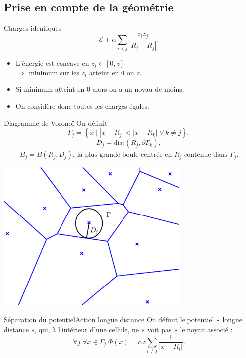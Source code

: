 \documentclass{beamer}
\begin{document}
\subsection{Prise en compte de la géométrie}
\begin{frame}{Charges identiques}
            \[\mathcal{E} + \alpha\sum_{i < j} \frac{z_i z_j}{|R_i-R_j|}.\]
    \begin{itemize}
        \item L'énergie est concave en $z_i \in [0, z]$\\
            $\Rightarrow$ minimum sur les $z_i$ atteint en $0$ ou $z$.
        \item Si minimum atteint en $0$ alors on a un noyau de moins.
        \item On considère donc toutes les charges égales.
    \end{itemize}
\end{frame}
\begin{frame}{Diagramme de Voronoï}
    On définit
              \[\Gamma_j = \left\{x \; \big| \; |x-R_j| < |x-R_k|\; \forall\, k\neq j\right\},\]
              \[D_j = \text{dist}(R_j, \mathit{\partial}\Gamma_k),\]
              \[B_j = \overline{B(R_j, D_j)}\text{, la plus grande boule centrée en $R_j$ contenue
              dans }\Gamma_j.\]
    \begin{center}
    \includegraphics[width=0.7\textwidth]{voronoi.pdf}
    \end{center}
\end{frame}
\begin{frame}{Séparation du potentiel}{Action longue distance}
    On définit le potentiel « longue distance », qui, à l'intérieur d'une cellule, ne « voit pas
    » le noyau associé :
    \[\forall j\; \forall x\in\Gamma_j\;\Phi(x) = \alpha z \sum_{i\neq j} \frac{1}{|x-R_i|}.\]
\end{frame}
\end{document}
